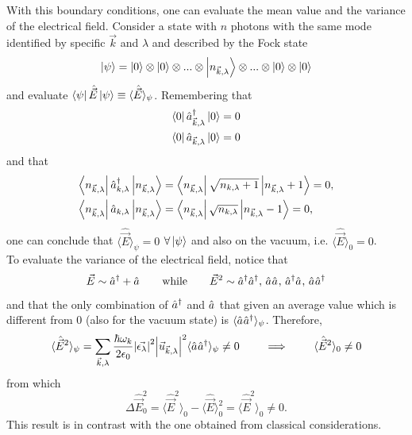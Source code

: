 With this boundary conditions, one can evaluate the mean value and the variance of the electrical field. Consider a state with $n$ photons with the same mode identified by specific $\vec{k}$ and $\lambda$ and described by the Fock state
\begin{equation}
    \ket{\psi} = \ket{0} \otimes \ket{0} \otimes ... \otimes \ket{n_{\vec{k}, \lambda}} \otimes...\otimes \ket{0} \otimes \ket{0}
\end{equation}
and evaluate $\bra{\psi} \hat{\vec{E}} \ket{\psi} \equiv \langle \hat{\vec{E}} \rangle_\psi$. Remembering that 
\begin{align*}
    \bra{0} \hat{a}^{\dagger}_{\vec{k}, \lambda} \ket{0} &= 0 \\
    \bra{0} \hat{a}_{\vec{k}, \lambda} \ket{0} &= 0 
\end{align*}
and that 
\begin{align*}
    \bra{n_{\vec{k}, \lambda}} \hat{a}^{\dagger}_{k, \lambda} \ket{n_{\vec{k}, \lambda}} &= \bra{n_{\vec{k}, \lambda}} \sqrt{n_{k, \lambda}+1} \ket{n_{\vec{k}, \lambda}+1} = 0, \\
    \bra{n_{\vec{k}, \lambda}} \hat{a}_{k, \lambda} \ket{n_{\vec{k}, \lambda}} &= \bra{n_{\vec{k}, \lambda}} \sqrt{n_{k, \lambda}} \ket{n_{\vec{k}, \lambda}-1} = 0,
\end{align*}
one can conclude that $\langle \hat{\vec{E}} \rangle_\psi = 0$ $\forall \ket{\psi}$ and also on the vacuum, i.e. $\langle \hat{\vec{E}} \rangle_0 = 0$. \\
To evaluate the variance of the electrical field, notice that
\begin{equation*}
    \vec{E} \sim \hat{a}^{\dagger}_{} + \hat{a}_{} \qquad \text{while} \qquad \vec{E}^2 \sim \hat{a}^{\dagger}_{}\hat{a}^{\dagger}_{}, \, \hat{a}_{}\hat{a}_{}, \, \hat{a}^{\dagger}_{}\hat{a}_{}, \, \hat{a}_{}\hat{a}^{\dagger}_{}
\end{equation*}
and that the only combination of $\hat{a}^{\dagger}_{}$ and $\hat{a}_{}$ that given an average value which is different from $0$ (also for the vacuum state) is $\langle \hat{a}_{}\hat{a}^{\dagger}_{} \rangle_{\psi}$. Therefore, 
\begin{equation*}
    \langle \hat{\vec{E}}^2 \rangle_\psi = \sum\limits_{\vec{k}, \lambda} \frac{\hbar \omega_k}{2 \epsilon_0} \abs{\vec{\epsilon_{\lambda}}}^2 \abs{\vec{u}_{\vec{k}, \lambda}}^2 \langle \hat{a}_{}\hat{a}^{\dagger}_{} \rangle_{\psi} \neq 0 \qquad \implies \qquad \langle \hat{\vec{E}}^2 \rangle_0 \neq 0
\end{equation*}
from which 
\begin{equation}
    \Delta \hat{\vec{E}}_0^2 = \langle \hat{\vec{E}}^2 \rangle_0 -\langle \hat{\vec{E}} \rangle_0^2 = \langle \hat{\vec{E}}^2 \rangle_0 \neq 0. 
\end{equation}
This result is in contrast with the one obtained from classical considerations. 

